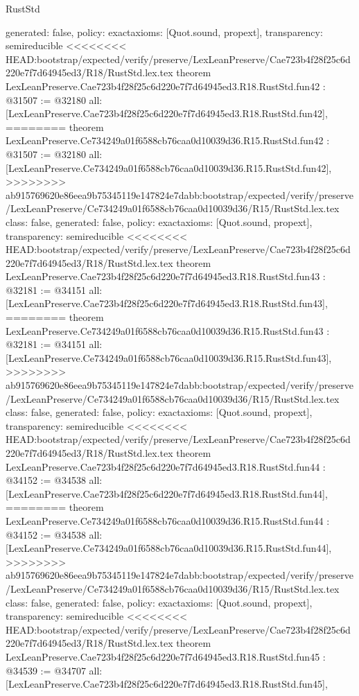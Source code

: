 \begin{lexlean}{RustStd}
\begin{coremodule}
{\begin{coremodule}
{{{{{{{{{{{{{{{{{{{{{{{{{{{{{{{{{{{{{{{{{{{{{  generated: false,
  policy: exact{axioms: [Quot.sound, propext]},
  transparency: semireducible
}
<<<<<<<< HEAD:bootstrap/expected/verify/preserve/LexLeanPreserve/Cae723b4f28f25c6d220e7f7d64945ed3/R18/RustStd.lex.tex
theorem LexLeanPreserve.Cae723b4f28f25c6d220e7f7d64945ed3.R18.RustStd.fun42 : @31507 := @32180 {
  all: [LexLeanPreserve.Cae723b4f28f25c6d220e7f7d64945ed3.R18.RustStd.fun42],
========
theorem LexLeanPreserve.Ce734249a01f6588cb76caa0d10039d36.R15.RustStd.fun42 : @31507 := @32180 {
  all: [LexLeanPreserve.Ce734249a01f6588cb76caa0d10039d36.R15.RustStd.fun42],
>>>>>>>> ab915769620e86eea9b75345119e147824e7dabb:bootstrap/expected/verify/preserve/LexLeanPreserve/Ce734249a01f6588cb76caa0d10039d36/R15/RustStd.lex.tex
  class: false,
  generated: false,
  policy: exact{axioms: [Quot.sound, propext]},
  transparency: semireducible
}
<<<<<<<< HEAD:bootstrap/expected/verify/preserve/LexLeanPreserve/Cae723b4f28f25c6d220e7f7d64945ed3/R18/RustStd.lex.tex
theorem LexLeanPreserve.Cae723b4f28f25c6d220e7f7d64945ed3.R18.RustStd.fun43 : @32181 := @34151 {
  all: [LexLeanPreserve.Cae723b4f28f25c6d220e7f7d64945ed3.R18.RustStd.fun43],
========
theorem LexLeanPreserve.Ce734249a01f6588cb76caa0d10039d36.R15.RustStd.fun43 : @32181 := @34151 {
  all: [LexLeanPreserve.Ce734249a01f6588cb76caa0d10039d36.R15.RustStd.fun43],
>>>>>>>> ab915769620e86eea9b75345119e147824e7dabb:bootstrap/expected/verify/preserve/LexLeanPreserve/Ce734249a01f6588cb76caa0d10039d36/R15/RustStd.lex.tex
  class: false,
  generated: false,
  policy: exact{axioms: [Quot.sound, propext]},
  transparency: semireducible
}
<<<<<<<< HEAD:bootstrap/expected/verify/preserve/LexLeanPreserve/Cae723b4f28f25c6d220e7f7d64945ed3/R18/RustStd.lex.tex
theorem LexLeanPreserve.Cae723b4f28f25c6d220e7f7d64945ed3.R18.RustStd.fun44 : @34152 := @34538 {
  all: [LexLeanPreserve.Cae723b4f28f25c6d220e7f7d64945ed3.R18.RustStd.fun44],
========
theorem LexLeanPreserve.Ce734249a01f6588cb76caa0d10039d36.R15.RustStd.fun44 : @34152 := @34538 {
  all: [LexLeanPreserve.Ce734249a01f6588cb76caa0d10039d36.R15.RustStd.fun44],
>>>>>>>> ab915769620e86eea9b75345119e147824e7dabb:bootstrap/expected/verify/preserve/LexLeanPreserve/Ce734249a01f6588cb76caa0d10039d36/R15/RustStd.lex.tex
  class: false,
  generated: false,
  policy: exact{axioms: [Quot.sound, propext]},
  transparency: semireducible
}
<<<<<<<< HEAD:bootstrap/expected/verify/preserve/LexLeanPreserve/Cae723b4f28f25c6d220e7f7d64945ed3/R18/RustStd.lex.tex
theorem LexLeanPreserve.Cae723b4f28f25c6d220e7f7d64945ed3.R18.RustStd.fun45 : @34539 := @34707 {
  all: [LexLeanPreserve.Cae723b4f28f25c6d220e7f7d64945ed3.R18.RustStd.fun45],
}}}}}}}}}}}}}}}}}}}}}}}}}}}}}}}}}}}}}}}}}}}}}}}}
\end{coremodule}}
\end{coremodule}
\end{lexlean}
